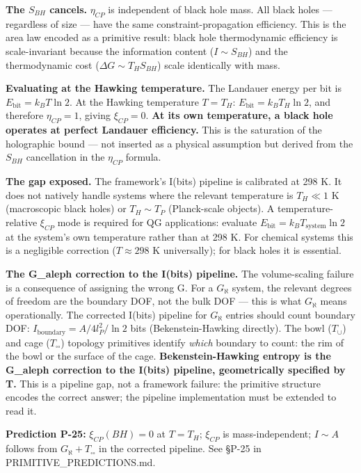 \documentclass[12pt,a4paper]{article}
\begin{document}
\textbf{The $S_{BH}$ cancels.} $\eta_{CP}$ is independent of black hole mass. All black holes --- regardless of size --- have the same constraint-propagation efficiency. This is the area law encoded as a primitive result: black hole thermodynamic efficiency is scale-invariant because the information content ($I \sim S_{BH}$) and the thermodynamic cost ($\Delta G \sim T_H S_{BH}$) scale identically with mass.

\textbf{Evaluating at the Hawking temperature.} The Landauer energy per bit is $E_{\text{bit}} = k_B T \ln 2$. At the Hawking temperature $T = T_H$: $E_{\text{bit}} = k_B T_H \ln 2$, and therefore $\eta_{CP} = 1$, giving $\xi_{CP} = 0$. \textbf{At its own temperature, a black hole operates at perfect Landauer efficiency.} This is the saturation of the holographic bound --- not inserted as a physical assumption but derived from the $S_{BH}$ cancellation in the $\eta_{CP}$ formula.

\textbf{The gap exposed.} The framework's I(bits) pipeline is calibrated at 298 K. It does not natively handle systems where the relevant temperature is $T_H \ll 1$ K (macroscopic black holes) or $T_H \sim T_P$ (Planck-scale objects). A temperature-relative $\xi_{CP}$ mode is required for QG applications: evaluate $E_{\text{bit}} = k_B T_{\text{system}} \ln 2$ at the system's own temperature rather than at 298 K. For chemical systems this is a negligible correction ($T \approx 298$ K universally); for black holes it is essential.

\textbf{The G\_aleph correction to the I(bits) pipeline.} The volume-scaling failure is a consequence of assigning the wrong G. For a $G_{\aleph}$ system, the relevant degrees of freedom are the boundary DOF, not the bulk DOF --- this is what $G_{\aleph}$ means operationally. The corrected I(bits) pipeline for $G_{\aleph}$ entries should count boundary DOF: $I_{\text{boundary}} = A/4l_P^2 / \ln 2$ bits (Bekenstein-Hawking directly). The bowl ($T_{\cup}$) and cage ($T_{\square\square}$) topology primitives identify \emph{which} boundary to count: the rim of the bowl or the surface of the cage. \textbf{Bekenstein-Hawking entropy is the G\_aleph correction to the I(bits) pipeline, geometrically specified by T.} This is a pipeline gap, not a framework failure: the primitive structure encodes the correct answer; the pipeline implementation must be extended to read it.

\textbf{Prediction P-25:} $\xi_{CP}(BH) = 0$ at $T = T_H$; $\xi_{CP}$ is mass-independent; $I \sim A$ follows from $G_{\aleph} + T_{\square\square}$ in the corrected pipeline. See §P-25 in PRIMITIVE\_PREDICTIONS.md.
\end{document}
